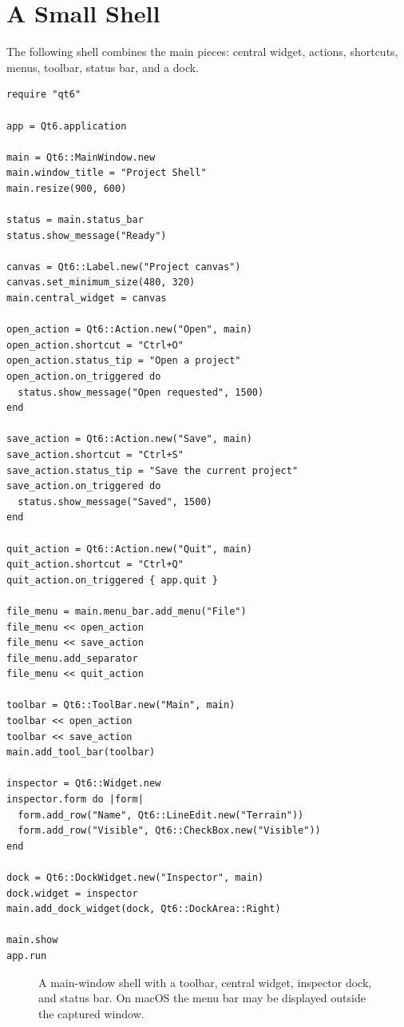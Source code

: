 \section{A Small Shell}

The following shell combines the main pieces: central widget, actions, shortcuts, menus, toolbar, status bar, and a dock.

\begin{lstlisting}[style=crystal]
require "qt6"

app = Qt6.application

main = Qt6::MainWindow.new
main.window_title = "Project Shell"
main.resize(900, 600)

status = main.status_bar
status.show_message("Ready")

canvas = Qt6::Label.new("Project canvas")
canvas.set_minimum_size(480, 320)
main.central_widget = canvas

open_action = Qt6::Action.new("Open", main)
open_action.shortcut = "Ctrl+O"
open_action.status_tip = "Open a project"
open_action.on_triggered do
  status.show_message("Open requested", 1500)
end

save_action = Qt6::Action.new("Save", main)
save_action.shortcut = "Ctrl+S"
save_action.status_tip = "Save the current project"
save_action.on_triggered do
  status.show_message("Saved", 1500)
end

quit_action = Qt6::Action.new("Quit", main)
quit_action.shortcut = "Ctrl+Q"
quit_action.on_triggered { app.quit }

file_menu = main.menu_bar.add_menu("File")
file_menu << open_action
file_menu << save_action
file_menu.add_separator
file_menu << quit_action

toolbar = Qt6::ToolBar.new("Main", main)
toolbar << open_action
toolbar << save_action
main.add_tool_bar(toolbar)

inspector = Qt6::Widget.new
inspector.form do |form|
  form.add_row("Name", Qt6::LineEdit.new("Terrain"))
  form.add_row("Visible", Qt6::CheckBox.new("Visible"))
end

dock = Qt6::DockWidget.new("Inspector", main)
dock.widget = inspector
main.add_dock_widget(dock, Qt6::DockArea::Right)

main.show
app.run
\end{lstlisting}

\begin{figure}[H]
  \centering
  \caption{A main-window shell with a toolbar, central widget, inspector dock, and status bar. On macOS the menu bar may be displayed outside the captured window.}
\end{figure}

